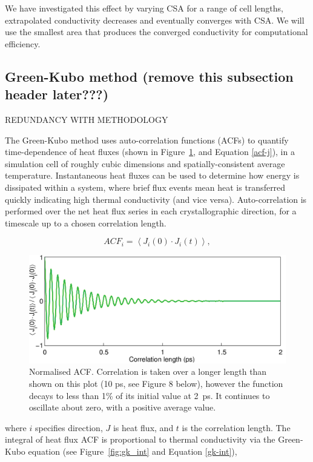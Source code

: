 \documentclass[%
preprint,                                  %
nofootinbib,
 amsmath,amssymb,
 aps,
]{revtex4-1}
\begin{document}
We have investigated this effect by varying CSA for a range of cell lengths, extrapolated conductivity decreases and eventually converges with CSA. We will use the smallest area that produces the converged conductivity for computational efficiency.


















\subsection{\label{sec:theory.gk}Green-Kubo method (remove this subsection header later???)}

REDUNDANCY WITH METHODOLOGY

The Green-Kubo method uses auto-correlation functions (ACFs) to quantify time-dependence of heat fluxes (shown in Figure~\ref{fig:gk_acf}, and Equation \ref{acf-j}), in a simulation cell of roughly cubic dimensions and spatially-consistent average temperature. Instantaneous heat fluxes can be used to determine how energy is dissipated within a system, where brief flux events mean heat is transferred quickly indicating high thermal conductivity (and vice versa). Auto-correlation is performed over the net heat flux series in each crystallographic direction, for a timescale up to a chosen correlation length.

\begin{equation}
ACF_i = \left \langle J_i(0) \cdot  J_i(t) \right \rangle,
\label{acf-j}
\end{equation}
\begin{figure}[h]
  \includegraphics[width=\linewidth]{images/gk_acf.png}
  \caption{Normalised ACF. Correlation is taken over a longer length than shown on this plot (10 ps, see Figure 8 below), however the function decays to less than 1\% of its initial value at 2~ps. It continues to oscillate about zero, with a positive average value.}
  \label{fig:gk_acf}
\end{figure}
where $i$ specifies direction, $J$ is heat flux, and $t$ is the correlation length. The integral of heat flux ACF is proportional to thermal conductivity via the Green-Kubo equation (see Figure~\ref{fig:gk_int} and Equation \ref{gk-int}), 
\end{document}

